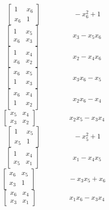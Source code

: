 \documentclass[12pt]{article}
\begin{document}
$$\left[\begin{matrix}1 & x_{6}\\x_{6} & 1\end{matrix}\right] \hspace{2cm} - x_{6}^{2} + 1$$
$$\left[\begin{matrix}1 & x_{5}\\x_{6} & x_{3}\end{matrix}\right] \hspace{2cm} x_{3} - x_{5} x_{6}$$
$$\left[\begin{matrix}1 & x_{4}\\x_{6} & x_{2}\end{matrix}\right] \hspace{2cm} x_{2} - x_{4} x_{6}$$
$$\left[\begin{matrix}x_{6} & x_{5}\\1 & x_{3}\end{matrix}\right] \hspace{2cm} x_{3} x_{6} - x_{5}$$
$$\left[\begin{matrix}x_{6} & x_{4}\\1 & x_{2}\end{matrix}\right] \hspace{2cm} x_{2} x_{6} - x_{4}$$
$$\left[\begin{matrix}x_{5} & x_{4}\\x_{3} & x_{2}\end{matrix}\right] \hspace{2cm} x_{2} x_{5} - x_{3} x_{4}$$
$$\left[\begin{matrix}1 & x_{5}\\x_{5} & 1\end{matrix}\right] \hspace{2cm} - x_{5}^{2} + 1$$
$$\left[\begin{matrix}1 & x_{4}\\x_{5} & x_{1}\end{matrix}\right] \hspace{2cm} x_{1} - x_{4} x_{5}$$
$$\left[\begin{matrix}x_{6} & x_{5}\\x_{3} & 1\end{matrix}\right] \hspace{2cm} - x_{3} x_{5} + x_{6}$$
$$\left[\begin{matrix}x_{6} & x_{4}\\x_{3} & x_{1}\end{matrix}\right] \hspace{2cm} x_{1} x_{6} - x_{3} x_{4}$$
\end{document}
